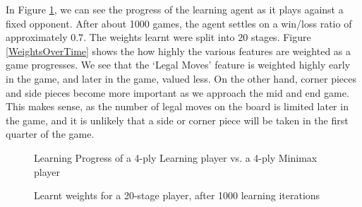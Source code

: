 \documentclass[11pt,twocolumn]{article}
\begin{document}
In Figure \ref{LearningProgress}, we can see the progress of the learning agent as it plays against a fixed opponent. After about 1000 games, the agent settles on a win/loss ratio of approximately $0.7$.
The weights learnt were split into $20$ stages. Figure \ref{WeightsOverTime} shows the how highly the various features are weighted as a game progresses. We see that the `Legal Moves' feature is weighted highly early in the game, and later in the game, valued less. On the other hand, corner pieces and side pieces become more important as we approach the mid and end game. This makes sense, as the number of legal moves on the board is limited later in the game, and it is unlikely that a side or corner piece will be taken in the first quarter of the game.

\begin{figure}[H] %
\centering
    \caption{Learning Progress of a 4-ply Learning player vs. a 4-ply Minimax player}
    \label{LearningProgress}
\end{figure}

\begin{figure}[H]\centering
    \caption{Learnt weights for a 20-stage player, after 1000 learning iterations} 
    \label{WeightsOverTime20}
\end{figure}
\end{document}
